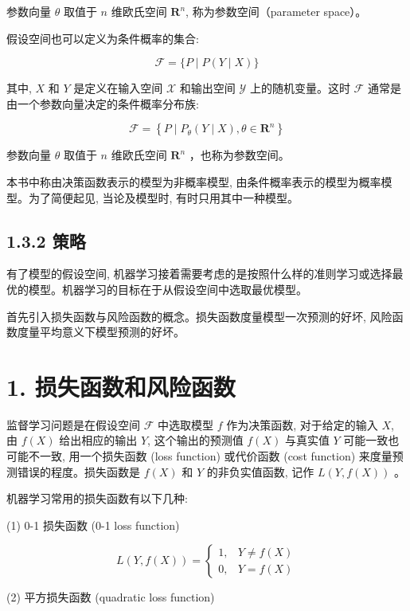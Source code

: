 \documentclass[10pt]{article}
\begin{document}
\begin{CJK*}{UTF8}{bsmi}
参数向量 $\theta$ 取值于 $n$ 维欧氏空间 $\boldsymbol{R}^{n}$, 称为参数空间（parameter space）。

假设空间也可以定义为条件概率的集合:


\begin{equation*}
\mathcal{F}=\{P \mid P(Y \mid X)\} \tag{1.7}
\end{equation*}


其中, $X$ 和 $Y$ 是定义在输入空间 $\mathcal{X}$ 和输出空间 $\mathcal{Y}$ 上的随机变量。这时 $\mathcal{F}$ 通常是由一个参数向量决定的条件概率分布族:


\begin{equation*}
\mathcal{F}=\left\{P \mid P_{\theta}(Y \mid X), \theta \in \boldsymbol{R}^{n}\right\} \tag{1.8}
\end{equation*}


参数向量 $\theta$ 取值于 $n$ 维欧氏空间 $\boldsymbol{R}^{n}$ ，也称为参数空间。

本书中称由决策函数表示的模型为非概率模型, 由条件概率表示的模型为概率模型。为了简便起见, 当论及模型时, 有时只用其中一种模型。

\subsection*{1.3.2 策略}
有了模型的假设空间, 机器学习接着需要考虑的是按照什么样的准则学习或选择最优的模型。机器学习的目标在于从假设空间中选取最优模型。

首先引入损失函数与风险函数的概念。损失函数度量模型一次预测的好坏, 风险函数度量平均意义下模型预测的好坏。

\section*{1. 损失函数和风险函数}
监督学习问题是在假设空间 $\mathcal{F}$ 中选取模型 $f$ 作为决策函数, 对于给定的输入 $X$, 由 $f(X)$ 给出相应的输出 $Y$, 这个输出的预测值 $f(X)$ 与真实值 $Y$ 可能一致也可能不一致, 用一个损失函数 (loss function) 或代价函数 (cost function) 来度量预测错误的程度。损失函数是 $f(X)$ 和 $Y$ 的非负实值函数, 记作 $L(Y, f(X))$ 。

机器学习常用的损失函数有以下几种:

(1) 0-1 损失函数 (0-1 loss function)

\[
L(Y, f(X))= \begin{cases}1, & Y \neq f(X)  \tag{1.9}\\ 0, & Y=f(X)\end{cases}
\]

(2) 平方损失函数 (quadratic loss function)



\end{CJK*}
\end{document}
